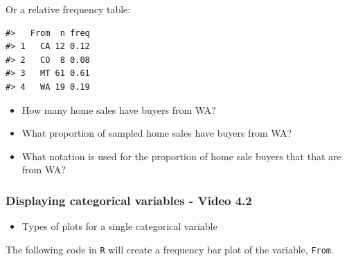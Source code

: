 \documentclass[
]{report}
\providecommand{\tightlist}{%
  \setlength{\itemsep}{0pt}\setlength{\parskip}{0pt}}
\begin{document}
Or a relative frequency table:

\begin{verbatim}
#>   From  n freq
#> 1   CA 12 0.12
#> 2   CO  8 0.08
#> 3   MT 61 0.61
#> 4   WA 19 0.19
\end{verbatim}

\begin{itemize}
\tightlist
\item
  How many home sales have buyers from WA?
\end{itemize}

\vspace{0.2in}

\begin{itemize}
\tightlist
\item
  What proportion of sampled home sales have buyers from WA?
\end{itemize}

\vspace{0.2in}

\begin{itemize}
\tightlist
\item
  What notation is used for the proportion of home sale buyers that that are from WA?
\end{itemize}

\vspace{0.2in}

\newpage

\subsubsection*{Displaying categorical variables - Video 4.2}\label{displaying-categorical-variables---video-4.2}

\begin{itemize}
\tightlist
\item
  Types of plots for a single categorical variable
\end{itemize}

\vspace{0.4in}

The following code in \texttt{R} will create a frequency bar plot of the variable, \texttt{From}.
\end{document}
